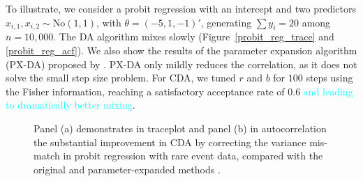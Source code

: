 \documentclass[11pt]{article}
\newcommand{\dave}[1]{{\textcolor{cyan}{#1}}}
\newcommand{\No}{\text{No}}
\begin{document}
To illustrate, we consider a probit regression with an intercept and two predictors $x_{i,1},x_{i,2}\sim \No(1,1)$, with $\theta=(-5,1,-1)'$, generating $\sum y_i=20$ among $n=10,000$. The \cite{albert1993bayesian} DA algorithm mixes slowly (Figure~\ref{probit_reg_trace} and \ref{probit_reg_acf}). We also show the 
results of the parameter expansion algorithm (PX-DA) proposed by \cite{liu1999parameter}. PX-DA only mildly reduces the correlation, as it does not solve the small step size problem.  For CDA, we tuned $r$ and $b$ for $100$ steps using the Fisher information, reaching a satisfactory acceptance rate of $0.6$ \dave{and leading to dramatically better mixing}. 


\begin{figure}[H]
  {%
    \qquad
  }
 {\caption{Panel (a) demonstrates in traceplot and panel (b) in autocorrelation the substantial improvement in CDA by correcting the variance mis-match in probit regression with rare event data, compared with the original \citep{albert1993bayesian} and parameter-expanded methods \citep{liu1999parameter}.}}
\end{figure}
\end{document}
